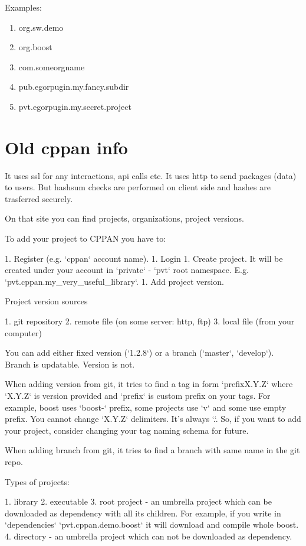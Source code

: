 Examples:
\begin{enumerate}
\item
org.sw.demo
\item
org.boost
\item
com.someorgname
\item
pub.egorpugin.my.fancy.subdir
\item
pvt.egorpugin.my.secret.project
\end{enumerate}




\section*{Old cppan info}

It uses ssl for any interactions, api calls etc. It uses http to send packages (data) to users. But hashsum checks are performed on client side and hashes are trasferred securely.

On that site you can find projects, organizations, project versions.

To add your project to CPPAN you have to:

1. Register (e.g. `cppan` account name).
1. Login
1. Create project. It will be created under your account in `private` - `pvt` root namespace. E.g. `pvt.cppan.my_very_useful_library`.
1. Add project version.

Project version sources

1. git repository
2. remote file (on some server: http, ftp)
3. local file (from your computer)

You can add either fixed version (`1.2.8`) or a branch (`master`, `develop`). Branch is updatable. Version is not.

When adding version from git, it tries to find a tag in form `prefixX.Y.Z` where `X.Y.Z` is version provided and `prefix` is custom prefix on your tags. For example, boost uses `boost-` prefix, some projects use `v` and some use empty prefix. You cannot change `X.Y.Z` delimiters. It's always `.`. So, if you want to add your project, consider changing your tag naming schema for future. 

When adding branch from git, it tries to find a branch with same name in the git repo.

Types of projects:

1. library
2. executable
3. root project - an umbrella project which can be downloaded as dependency with all its children. For example, if you write in `dependencies` `pvt.cppan.demo.boost` it will download and compile whole boost.
4. directory - an umbrella project which can not be downloaded as dependency.

